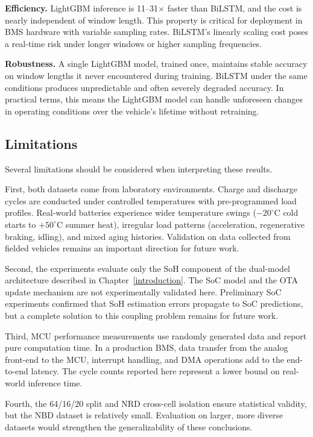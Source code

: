 \textbf{Efficiency.} LightGBM inference is 11--31$\times$ faster than BiLSTM, and the cost is nearly independent of window length. This property is critical for deployment in BMS hardware with variable sampling rates. BiLSTM's linearly scaling cost poses a real-time risk under longer windows or higher sampling frequencies.

\textbf{Robustness.} A single LightGBM model, trained once, maintains stable accuracy on window lengths it never encountered during training. BiLSTM under the same conditions produces unpredictable and often severely degraded accuracy. In practical terms, this means the LightGBM model can handle unforeseen changes in operating conditions over the vehicle's lifetime without retraining.

\subsection{Limitations}

Several limitations should be considered when interpreting these results.

First, both datasets come from laboratory environments. Charge and discharge cycles are conducted under controlled temperatures with pre-programmed load profiles. Real-world batteries experience wider temperature swings ($-20^\circ$C cold starts to $+50^\circ$C summer heat), irregular load patterns (acceleration, regenerative braking, idling), and mixed aging histories. Validation on data collected from fielded vehicles remains an important direction for future work.

Second, the experiments evaluate only the SoH component of the dual-model architecture described in Chapter~\ref{introduction}. The SoC model and the OTA update mechanism are not experimentally validated here. Preliminary SoC experiments confirmed that SoH estimation errors propagate to SoC predictions, but a complete solution to this coupling problem remains for future work.

Third, MCU performance measurements use randomly generated data and report pure computation time. In a production BMS, data transfer from the analog front-end to the MCU, interrupt handling, and DMA operations add to the end-to-end latency. The cycle counts reported here represent a lower bound on real-world inference time.

Fourth, the 64/16/20 split and NRD cross-cell isolation ensure statistical validity, but the NBD dataset is relatively small. Evaluation on larger, more diverse datasets would strengthen the generalizability of these conclusions.
